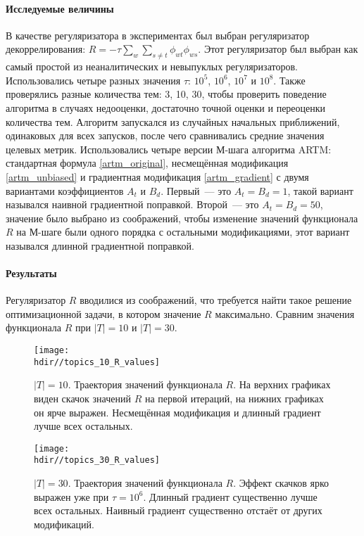 \documentclass[12pt, twoside]{article}
\newcommand{\hdir}{.}
\begin{document}
\paragraph{Исследуемые величины}
В качестве регуляризатора в экспериментах был выбран регуляризатор декоррелирования: $R = - \tau \sum_w \sum_{s \neq t} \phi_{wt} \phi_{ws}$. Этот регуляризатор был выбран как самый простой из неаналитических и невыпуклых регуляризаторов. Использовались четыре разных значения $\tau$: $10^5$, $10^6$, $10^7$ и $10^8$. Также проверялись разные количества тем: 3, 10, 30, чтобы проверить поведение алгоритма в случаях недооценки, достаточно точной оценки и переоценки  количества тем. Алгоритм  запускался из случайных начальных приближений, одинаковых для всех запусков, после чего сравнивались средние значения целевых метрик. Использовались четыре версии М-шага алгоритма ARTM: стандартная формула \eqref{artm_original}, несмещённая модификация \eqref{artm_unbiased} и градиентная модификация  \eqref{artm_gradient} с двумя вариантами коэффициентов $A_t$ и $B_d$. Первый~--- это $A_t = B_d = 1$, такой вариант назывался наивной градиентной поправкой. Второй~--- это $A_t = B_d = 50$, значение было выбрано из соображений, чтобы изменение значений функционала $R$ на М-шаге были одного порядка с остальными модификациями, этот вариант назывался длинной градиентной поправкой.
\paragraph{Результаты}

Регуляризатор $R$  вводилися из соображений, что требуется найти такое решение оптимизационной задачи, в котором значение $R$ максимально. Сравним значения функционала $R$ при $|T| = 10$ и $|T| = 30$.

\begin{figure}[!ht]
	\centering
	\texttt{[image: \\hdir//topics\_10\_R\_values]}
	\caption{$|T| = 10$. Траектория значений функционала $R$. На верхних графиках виден скачок значений $R$ на первой итераций, на нижних графиках он ярче выражен. Несмещённая модификация и длинный градиент лучше всех остальных.}
\end{figure}

\begin{figure}[!ht]
	\centering  
	\texttt{[image: \\hdir//topics\_30\_R\_values]}
	\caption{$|T| = 30$. Траектория значений функционала  $R$.  Эффект скачков ярко выражен уже при $\tau = 10^6$. Длинный градиент существенно лучше всех остальных. Наивный градиент существенно отстаёт от других модификаций.}  
\end{figure}
\end{document}
